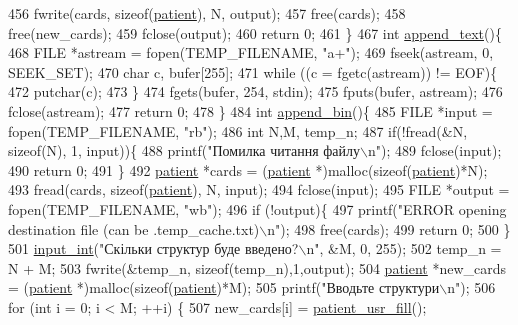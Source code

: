 \begin{DoxyCodeInclude}
{{{{{456     fwrite(cards, \textcolor{keyword}{sizeof}(\hyperlink{structpatient__struct}{patient}), N, output);
457     free(cards);
458     free(new\_cards);
459     fclose(output);
460     \textcolor{keywordflow}{return} 0;
461 \}
467 \textcolor{keywordtype}{int} \hyperlink{main_8c_ad69ac85cc5d44de29b1448bd72937203}{append\_text}()\{
468     FILE *astream = fopen(TEMP\_FILENAME, \textcolor{stringliteral}{"a+"});
469     fseek(astream, 0, SEEK\_SET);
470     \textcolor{keywordtype}{char} c, bufer[255];
471     \textcolor{keywordflow}{while} ((c = fgetc(astream)) != EOF)\{
472         putchar(c);
473     \}
474     fgets(bufer, 254, stdin);
475     fputs(bufer, astream);
476     fclose(astream);
477     \textcolor{keywordflow}{return} 0;
478 \}
484 \textcolor{keywordtype}{int} \hyperlink{main_8c_a5e87855f218fa953fdc1649bf832bb9c}{append\_bin}()\{
485     FILE *input = fopen(TEMP\_FILENAME, \textcolor{stringliteral}{"rb"});
486     \textcolor{keywordtype}{int} N,M, temp\_n;
487     \textcolor{keywordflow}{if}(!fread(&N, \textcolor{keyword}{sizeof}(N), 1, input))\{
488         printf(\textcolor{stringliteral}{"Помилка читання файлу\(\backslash\)n"});
489         fclose(input);
490         \textcolor{keywordflow}{return} 0;
491     \}
492     \hyperlink{structpatient__struct}{patient} *cards = (\hyperlink{structpatient__struct}{patient} *)malloc(\textcolor{keyword}{sizeof}(\hyperlink{structpatient__struct}{patient})*N);
493     fread(cards, \textcolor{keyword}{sizeof}(\hyperlink{structpatient__struct}{patient}), N, input);
494     fclose(input);
495     FILE *output = fopen(TEMP\_FILENAME, \textcolor{stringliteral}{"wb"});
496     \textcolor{keywordflow}{if} (!output)\{
497         printf(\textcolor{stringliteral}{"ERROR opening destination file (can be .temp\_cache.txt)\(\backslash\)n"});
498         free(cards);
499         \textcolor{keywordflow}{return} 0;
500     \}
501     \hyperlink{lab__functions_8h_a6f453bc035d85e967bd5032eca31a155}{input\_int}(\textcolor{stringliteral}{"Скільки структур буде введено?\(\backslash\)n"}, &M, 0, 255);
502     temp\_n = N + M;
503     fwrite(&temp\_n, \textcolor{keyword}{sizeof}(temp\_n),1,output);
504     \hyperlink{structpatient__struct}{patient} *new\_cards = (\hyperlink{structpatient__struct}{patient} *)malloc(\textcolor{keyword}{sizeof}(\hyperlink{structpatient__struct}{patient})*M);
505     printf(\textcolor{stringliteral}{"Вводьте структури\(\backslash\)n"});
506     \textcolor{keywordflow}{for} (\textcolor{keywordtype}{int} i = 0; i < M; ++i) \{
507         new\_cards[i] = \hyperlink{main_8c_a582ffa97511f52032c2d36314db2a774}{patient\_usr\_fill}();
}}}}}
\end{DoxyCodeInclude}
